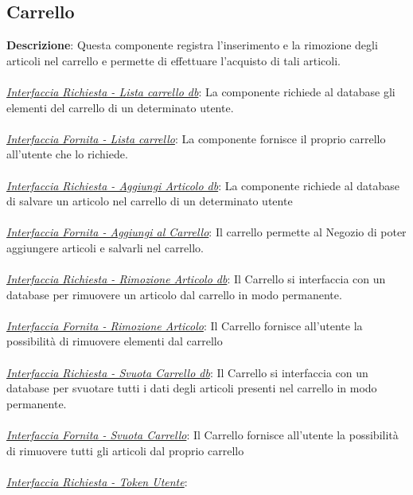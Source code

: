 \documentclass{report}
\begin{document}
\subsection*{Carrello}
\textbf{Descrizione}: Questa componente registra l'inserimento e la rimozione degli articoli nel carrello e permette di effettuare l'acquisto di tali articoli. \\ \\
\uline{\textit{Interfaccia Richiesta - Lista carrello db}}: 
La componente richiede al database gli elementi del carrello di un determinato utente. \\\\
\uline{\textit{Interfaccia Fornita - Lista carrello}}: 
La componente fornisce il proprio carrello all'utente che lo richiede.\\\\
\uline{\textit{Interfaccia Richiesta - Aggiungi Articolo db}}:
 La componente richiede al database di salvare un articolo nel carrello di un determinato utente\\\\ 
\uline{\textit{Interfaccia Fornita - Aggiungi al Carrello}}: 
Il carrello permette al Negozio di poter aggiungere articoli e salvarli nel carrello.\\ \\
\uline{\textit{Interfaccia Richiesta - Rimozione Articolo db}}: 
Il Carrello si interfaccia con un database per rimuovere un articolo dal carrello in modo permanente.\\ \\
\uline{\textit{Interfaccia Fornita - Rimozione Articolo}}: 
Il Carrello fornisce all'utente la possibilità di rimuovere elementi dal carrello\\\\
\uline{\textit{Interfaccia Richiesta - Svuota Carrello db}}: 
Il Carrello si interfaccia con un database per svuotare tutti i dati degli articoli presenti nel carrello in modo permanente.\\ \\
\uline{\textit{Interfaccia Fornita - Svuota Carrello}}:
Il Carrello fornisce all'utente la possibilità di rimuovere tutti gli articoli dal proprio carrello\\ \\
\uline{\textit{Interfaccia Richiesta - Token Utente}}: 
\end{document}
